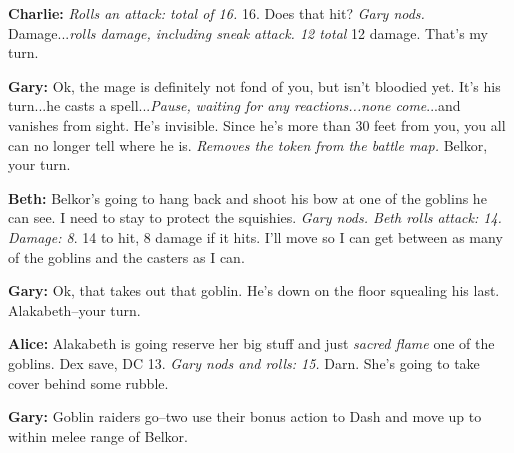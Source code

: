 \textbf{Charlie:} \textit{Rolls an attack: total of 16.} 16. Does that hit? \textit{Gary nods.} Damage...\textit{rolls damage, including sneak attack. 12 total} 12 damage. That's my turn.

\textbf{Gary:} Ok, the mage is definitely not fond of you, but isn't bloodied yet. It's his turn...he casts a spell...\textit{Pause, waiting for any reactions...none come}...and vanishes from sight. He's invisible. Since he's more than 30 feet from you, you all can no longer tell where he is. \textit{Removes the token from the battle map.} Belkor, your turn.

\textbf{Beth:} Belkor's going to hang back and shoot his bow at one of the goblins he can see. I need to stay to protect the squishies. \textit{Gary nods. Beth rolls attack: 14. Damage: 8}. 14 to hit, 8 damage if it hits. I'll move so I can get between as many of the goblins and the casters as I can.

\textbf{Gary:} Ok, that takes out that goblin. He's down on the floor squealing his last. Alakabeth--your turn.

\textbf{Alice:} Alakabeth is going reserve her big stuff and just \textit{sacred flame} one of the goblins. Dex save, DC 13. \textit{Gary nods and rolls: 15.} Darn. She's going to take cover behind some rubble.

\textbf{Gary:} Goblin raiders go--two use their bonus action to Dash and move up to within melee range of Belkor.